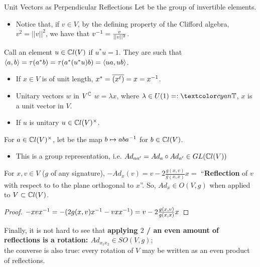 \begin{frame}{Unit Vectors as Perpendicular Reflections} %
    Let  be the group of invertible elements.
        \begin{itemize}
            
        \item Notice that, if $v \in V$, by the defining property of the Clifford algebra, $v^2 = ||v||^2$, we have that $v^{-1} = \frac{v}{||v||^2}$.
            
        \end{itemize}
    
    Call an element $u \in \mathbb C l(V)$  if $u^* u = 1$. They are such that $\langle a, b \rangle = \tau(a^* b) = \tau(a^*(u^* u) b)  = \langle ua, ub \rangle$.
        \begin{itemize}
            
        \item If $x \in V$ is of unit length,  $x^* = \overline{(x^t)} = x = x^
        {-1}$.
        
        \item Unitary vectors $w$ in $V^\mathbb C$ \Iff $w = \lambda x$, where $\lambda \in U(1) =: \defn{\TT}$, $x$ is a unit vector in $V$.
        
        \item If $u$ is unitary \then $u \in \mathbb C l(V)^\times$.
            
        \end{itemize}
    

\end{frame}

\begin{frame} %

    For $a \in \mathbb C l(V)^\times$, let  be the map $b \mapsto a b a^{-1}$ for $b \in \mathbb C l(V)$. 
        \begin{itemize}
            
        \item This is a group representation, i.e. $Ad_{aa'} = Ad_a \circ Ad_{a'} \in GL(\mathbb C l(V))$ 
            
        \end{itemize}

    \begin{lemma}
    For $x, v \in V$ ($g$ of any signature), $-Ad_x(v) = v - 2 \frac{g(x, v)}{g(x, x)}x = $ ``\textbf{Reflection} of $v$ with respect to to the plane orthogonal to $x$''. So, $Ad_x \in O(V, g)$ when applied to $V\subset \mathbb C l(V)$.
    \end{lemma}
    \begin{proof} $-xvx^{-1} = -(2g(x, v)x^{-1} - v x x^{-1}) = v - 2 \frac{g(x, v)}{g(x, x)}x$
    \end{proof}
    
    Finally, it is not hard to see that \textbf{applying $2$ / an even amount of reflections is a rotation: $Ad_{x_1 x_2}\in SO(V, g)$}; \\the converse is also true: every rotation of $V$ may be written as an even product of reflections.
    
\end{frame}

